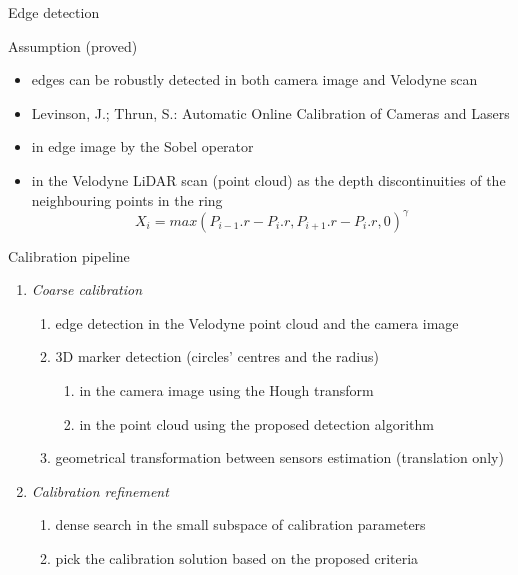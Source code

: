 \documentclass[pdf]{beamer}
\begin{document}
	\begin{frame}{Edge detection}
		\begin{alertblock}{Assumption (proved)}		
		\begin{itemize}
			\item edges can be robustly detected in both camera image and Velodyne scan
			\item \scriptsize{Levinson, J.; Thrun, S.: Automatic Online Calibration of Cameras and Lasers}
		\end{itemize}
		\end{alertblock}
		
		\begin{itemize}
			\item in edge image by the Sobel operator
			\item in the Velodyne LiDAR scan (point cloud) as the depth discontinuities of the neighbouring points in the ring
			\begin{equation}
				X_i = max(P_{i-1}.r - P_i.r, P_{i+1}.r - P_i.r, 0)^\gamma
			\end{equation}
		\end{itemize}
	\end{frame}

	\begin{frame}{Calibration pipeline}
		\begin{enumerate}
			\item \emph{Coarse calibration}
			\begin{enumerate}
				\item edge detection in the Velodyne point cloud and the camera image
				\item $3$D marker detection (circles' centres and the radius)
				\begin{enumerate}
					\item in the camera image using the Hough transform
					\item in the point cloud using the proposed detection algorithm
				\end{enumerate}
				\item geometrical transformation between sensors estimation (translation only)
			\end{enumerate}
			\item \emph{Calibration refinement}
			\begin{enumerate}
				\item dense search in the small subspace of calibration parameters
				\item pick the calibration solution based on the proposed criteria
			\end{enumerate}
		\end{enumerate}
	\end{frame}
\end{document}
